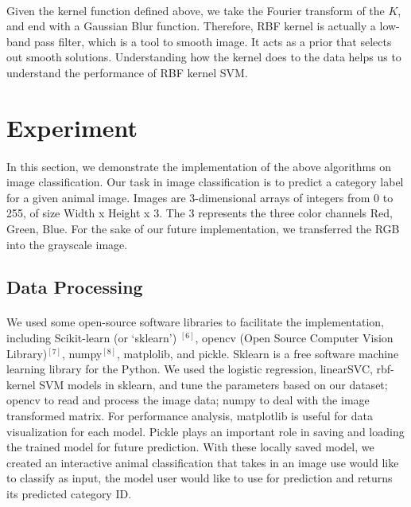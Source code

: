 \documentclass{article}
\begin{document}
\paragraph{}
Given the kernel function defined above, we take the Fourier transform of the $K$, and end with a Gaussian Blur function. Therefore, RBF kernel is actually a low-band pass filter, which is a tool to smooth image. It acts as a prior that selects out smooth solutions. Understanding how the kernel does to the data helps us to understand the performance of RBF kernel SVM. 


\section{Experiment}
\paragraph{}
In this section, we demonstrate the implementation of the above algorithms on image classification. Our task in image classification is to predict a category label for a given animal image. Images are 3-dimensional arrays of integers from 0 to 255, of size Width x Height x 3. The 3 represents the three color channels Red, Green, Blue. For the sake of our future implementation, we transferred the RGB into the grayscale image.

\subsection{Data Processing}
\paragraph{}
We used some open-source software libraries to facilitate the implementation, including Scikit-learn (or ‘sklearn’) $^{[6]}$, opencv (Open Source Computer Vision Library)$^{[7]}$, numpy$^{[8]}$,  matplolib, and pickle. Sklearn is a free software machine learning library for the Python. We used the logistic regression, linearSVC, rbf-kernel SVM models in sklearn, and tune the parameters based on our dataset; opencv to read and process the image data; numpy to deal with the image transformed matrix. For performance analysis, matplotlib is useful for data visualization for each model. Pickle plays an important role in saving and loading the trained model for future prediction. With these locally saved model, we created an interactive animal classification that takes in an image use would like to classify as input, the model user would like to use for prediction and returns its predicted category ID.
\end{document}
